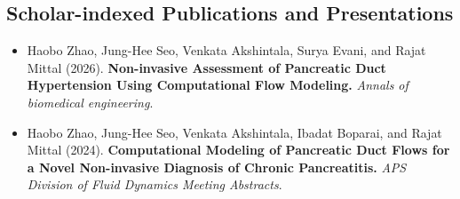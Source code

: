 
\subsection*{Scholar-indexed Publications and Presentations}
\begin{itemize}[leftmargin=*, itemsep=0pt]
    \item Haobo Zhao, Jung-Hee Seo, Venkata Akshintala, Surya Evani, and Rajat Mittal (2026). \textbf{Non-invasive Assessment of Pancreatic Duct Hypertension Using Computational Flow Modeling.} \textit{Annals of biomedical engineering}.
    \item Haobo Zhao, Jung-Hee Seo, Venkata Akshintala, Ibadat Boparai, and Rajat Mittal (2024). \textbf{Computational Modeling of Pancreatic Duct Flows for a Novel Non-invasive Diagnosis of Chronic Pancreatitis.} \textit{APS Division of Fluid Dynamics Meeting Abstracts}.
\end{itemize}
